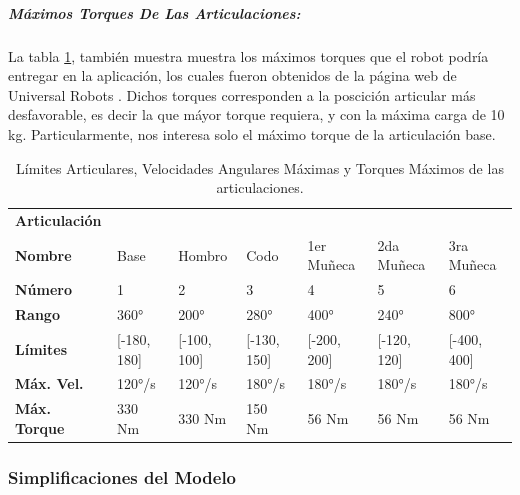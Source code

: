 \documentclass{article}
\begin{document}
\begin{sloppypar}
\subparagraph{Máximos Torques De Las Articulaciones:}
\label{sec:Máximos Torques De Las Articulaciones:}
\hfill \break
La tabla \ref{table:Límites Articulares, Velocidades Angulares Máximas y Torques Máximos de las articulaciones}, también muestra muestra los máximos torques que el robot podría entregar en la aplicación, los cuales fueron obtenidos de la página web de Universal Robots \cite{Torques_Máximos}. Dichos torques corresponden a la poscición articular más desfavorable, es decir la que máyor torque requiera, y con la máxima carga de 10 kg. Particularmente, nos interesa solo el máximo torque de la articulación base.

\begin{table}[H]
    \centering
    \begin{tabular}{|l|llllll|}
    \cline{1-1}
    \textbf{Articulación}                                                                             \\ \cline{1-7}
    \textbf{Nombre}    & Base       & Hombro     & Codo       & 1er Muñeca & 2da Muñeca  & 3ra Muñeca \\ \cline{1-7}
    \textbf{Número}    & 1          & 2          & 3          & 4          & 5           & 6          \\ \cline{1-7}
    \textbf{Rango}     & 360°       & 200°       & 280°       & 400°       & 240°        & 800°       \\ \cline{1-7}
    \textbf{Límites}   &[-180, 180] &[-100, 100] &[-130, 150] &[-200, 200] &[-120, 120]  &[-400, 400] \\ \cline{1-7}
    \textbf{Máx. Vel.} & 120°/s     & 120°/s     & 180°/s     & 180°/s     & 180°/s      & 180°/s     \\ \cline{1-7}
    \textbf{Máx. Torque} & 330 Nm   & 330 Nm     & 150 Nm     & 56 Nm      & 56 Nm       & 56 Nm     \\ \cline{1-7}
    \end{tabular}
    \caption{\label{table:Límites Articulares, Velocidades Angulares Máximas y Torques Máximos de las articulaciones}Límites Articulares, Velocidades Angulares Máximas y Torques Máximos de las articulaciones.}
\end{table}



\subsubsection{Simplificaciones del Modelo}
\label{sec:Simplificaciones del Modelo}


\end{sloppypar}
\end{document}
